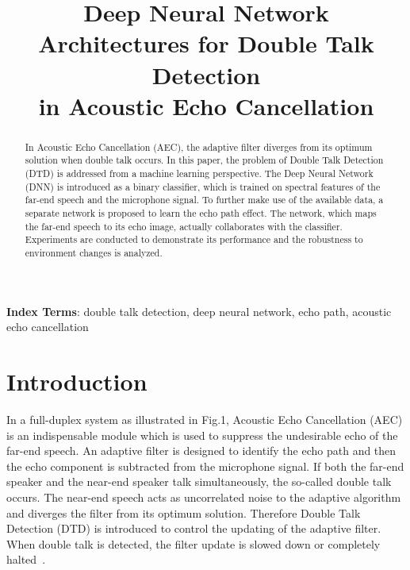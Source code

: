 \documentclass[a4paper]{article}
\title{Deep Neural Network Architectures for Double Talk Detection \\
        in Acoustic Echo Cancellation}
\begin{document}
\maketitle
%
\begin{abstract}
  In Acoustic Echo Cancellation (AEC), the adaptive filter diverges from its optimum solution when double talk occurs. In this paper, the problem of Double Talk Detection (DTD) is addressed from a machine learning perspective. The Deep Neural Network (DNN) is introduced as a binary classifier, which is trained on spectral features of the far-end speech and the microphone signal. To further make use of the available data, a separate network is proposed to learn the echo path effect. The network, which maps the far-end speech to its echo image, actually collaborates with the classifier. Experiments are conducted to demonstrate its performance and the robustness to environment changes is analyzed.
\end{abstract}
\noindent\textbf{Index Terms}: double talk detection, deep neural network, echo path, acoustic echo cancellation

\section{Introduction}

In a full-duplex system as illustrated in Fig.1, Acoustic Echo Cancellation (AEC) is an indispensable module which is used to suppress the undesirable echo of the far-end speech. An adaptive filter is designed to identify the echo path and then the echo component is subtracted from the microphone signal. If both the far-end speaker and the near-end speaker talk simultaneously, the so-called double talk occurs. The near-end speech acts as uncorrelated noise to the adaptive algorithm and diverges the filter from its optimum solution. Therefore Double Talk Detection (DTD) is introduced to control the updating of the adaptive filter. When double talk is detected, the filter update is slowed down or completely halted~\cite{benesty2011double}.
\end{document}
